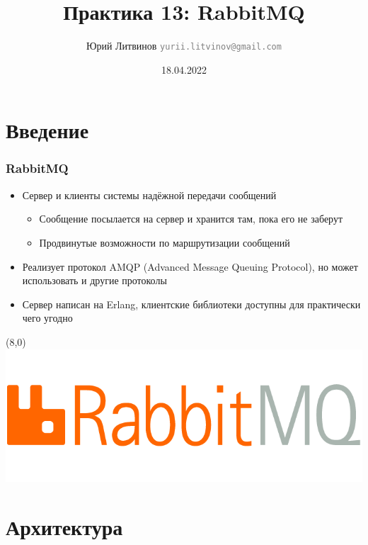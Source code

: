 \documentclass[xetex,mathserif,serif]{beamer}
\title{Практика 13: RabbitMQ}
\author[Юрий Литвинов]{Юрий Литвинов \newline \textcolor{gray}{\small\texttt{yurii.litvinov@gmail.com}}}
\date{18.04.2022}
\begin{document}
    \frame{\titlepage}

    \section{Введение}

    \begin{frame}
        \frametitle{RabbitMQ}
        \begin{itemize}
            \item Сервер и клиенты системы надёжной передачи сообщений
            \begin{itemize}
                \item Сообщение посылается на сервер и хранится там, пока его не заберут
                \item Продвинутые возможности по маршрутизации сообщений
            \end{itemize}
            \item Реализует протокол AMQP (Advanced Message Queuing Protocol), но может использовать и другие протоколы
            \item Сервер написан на Erlang, клиентские библиотеки доступны для практически чего угодно
        \end{itemize}
        \begin{textblock}{3}(8,0)
            \includegraphics[width=\textwidth]{rabbitmqLogo.png}
        \end{textblock}
    \end{frame}

    \section{Архитектура}
\end{document}
